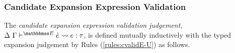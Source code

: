 


\subsubsection{Candidate Expansion Expression Validation}
The \emph{candidate expansion expression validation judgement}, $\cvalidE{\Delta}{\Gamma}{\escenev}{\ce}{e}{\tau}$, is defined mutually inductively with the typed expansion judgement by Rules (\ref*{rules:cvalidE-U}) as follows.%

